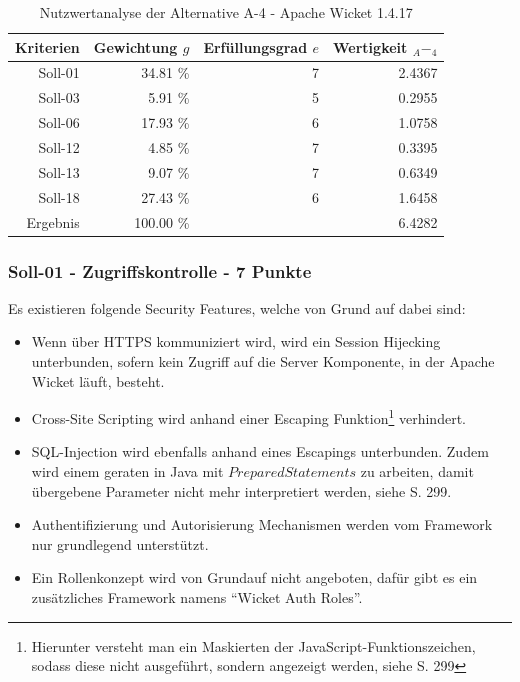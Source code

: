   \begin{table}[ht]
    \sffamily 
    \begin{center}
      \begin{tabular}{r|rrr}
        \toprule
        Kriterien & Gewichtung \(g\) & Erfüllungsgrad \(e\) & Wertigkeit
        \(_A-_4\) \\
        \midrule
        Soll-01   & 34.81 \% & 7 & 2.4367 \\
        Soll-03   &  5.91 \% & 5 & 0.2955 \\
        Soll-06   & 17.93 \% & 6 & 1.0758 \\
        Soll-12   &  4.85 \% & 7 & 0.3395 \\
        Soll-13   &  9.07 \% & 7 & 0.6349 \\
        Soll-18   & 27.43 \% & 6 & 1.6458 \\
        \midrule
        \midrule
        Ergebnis  & 100.00 \% &   & 6.4282 \\
        \bottomrule
      \end{tabular}
      \caption{Nutzwertanalyse der Alternative A-4 - Apache Wicket 1.4.17}
      \label{tab:nwaA4}
    \end{center}
  \end{table}
  
  \subsubsection{Soll-01 - Zugriffskontrolle - 7 Punkte}
  
  Es existieren folgende Security Features, welche von Grund auf dabei sind:
  
  \begin{itemize}
    \item Wenn über HTTPS kommuniziert wird, wird ein Session Hijecking
    unterbunden, sofern kein Zugriff auf die Server Komponente, in der Apache
    Wicket läuft, besteht.
    \item Cross-Site Scripting wird anhand einer Escaping
    Funktion\footnote{Hierunter versteht man ein Maskierten der
    JavaScript-Funktionszeichen, sodass diese nicht ausgeführt, sondern
    angezeigt werden, siehe \cite{Wicket} S. 299} verhindert.
    \item SQL-Injection wird ebenfalls anhand eines Escapings unterbunden. Zudem
    wird einem geraten in Java mit \(PreparedStatements\) zu arbeiten, damit
    übergebene Parameter nicht mehr interpretiert werden, siehe \cite{Wicket} S.
    299.
    \item Authentifizierung und Autorisierung Mechanismen werden vom Framework
    nur grundlegend unterstützt. 
    \item Ein Rollenkonzept wird von Grundauf nicht angeboten, dafür gibt es ein
    zusätzliches Framework namens ``Wicket Auth Roles''. 
  \end{itemize}
  

